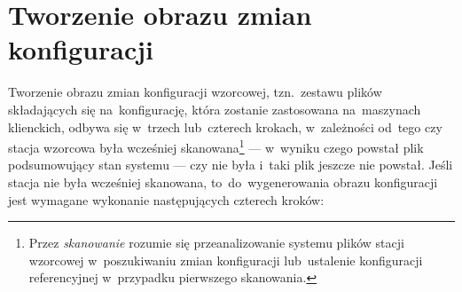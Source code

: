 \documentclass[thesis]{subfiles}
\begin{document}

\section{Tworzenie obrazu zmian konfiguracji}
\label{sec:tworzenie-obrazu-konfiguracji}

Tworzenie obrazu zmian konfiguracji wzorcowej, tzn.~zestawu plików składających się na~konfigurację, która zostanie zastosowana na~maszynach klienckich, odbywa się w~trzech lub~czterech krokach, w~zależności od~tego czy stacja wzorcowa była wcześniej skanowana\footnote{Przez \emph{skanowanie} rozumie się przeanalizowanie systemu plików stacji wzorcowej w~poszukiwaniu zmian konfiguracji lub~ustalenie konfiguracji referencyjnej w~przypadku pierwszego skanowania.} --- w~wyniku czego powstał plik podsumowujący stan systemu --- czy nie była i~taki plik jeszcze nie powstał. Jeśli stacja nie była wcześniej skanowana, to~do~wygenerowania obrazu konfiguracji jest wymagane wykonanie następujących czterech kroków:\mynobreakpar
\end{document}

